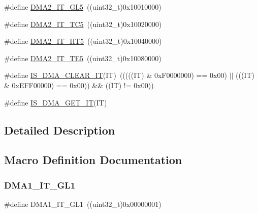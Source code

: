 \begin{DoxyCompactItemize}
\item 
\#define \mbox{\hyperlink{group___d_m_a__interrupts__definition_ga2205d7e002767d98f7aa206634374082}{D\+M\+A2\+\_\+\+I\+T\+\_\+\+G\+L5}}~((uint32\+\_\+t)0x10010000)
\item 
\#define \mbox{\hyperlink{group___d_m_a__interrupts__definition_gaa1134531a0aeb8daeb516985562129b0}{D\+M\+A2\+\_\+\+I\+T\+\_\+\+T\+C5}}~((uint32\+\_\+t)0x10020000)
\item 
\#define \mbox{\hyperlink{group___d_m_a__interrupts__definition_ga4c1e0d1572267c1d48d787009148e3ef}{D\+M\+A2\+\_\+\+I\+T\+\_\+\+H\+T5}}~((uint32\+\_\+t)0x10040000)
\item 
\#define \mbox{\hyperlink{group___d_m_a__interrupts__definition_gad47115e9a4d0d3f5d9101097983b5525}{D\+M\+A2\+\_\+\+I\+T\+\_\+\+T\+E5}}~((uint32\+\_\+t)0x10080000)
\item 
\#define \mbox{\hyperlink{group___d_m_a__interrupts__definition_ga390481b083355ed774b04f70a42f0dfb}{I\+S\+\_\+\+D\+M\+A\+\_\+\+C\+L\+E\+A\+R\+\_\+\+IT}}(IT)~(((((IT) \& 0x\+F0000000) == 0x00) $\vert$$\vert$ (((\+I\+T) \& 0x\+E\+F\+F00000) == 0x00)) \&\& ((\+I\+T) != 0x00))
\item 
\#define \mbox{\hyperlink{group___d_m_a__interrupts__definition_gaaafa1bd74bc5e78e276c731faa8eed22}{I\+S\+\_\+\+D\+M\+A\+\_\+\+G\+E\+T\+\_\+\+IT}}(IT)
\end{DoxyCompactItemize}


\subsection{Detailed Description}


\subsection{Macro Definition Documentation}
\mbox{\label{group___d_m_a__interrupts__definition_ga017d35f4f6fbf5689ef39af7227bc5b0}} 
\subsubsection{\texorpdfstring{DMA1\_IT\_GL1}{DMA1\_IT\_GL1}}
{\footnotesize\ttfamily \#define D\+M\+A1\+\_\+\+I\+T\+\_\+\+G\+L1~((uint32\+\_\+t)0x00000001)}

